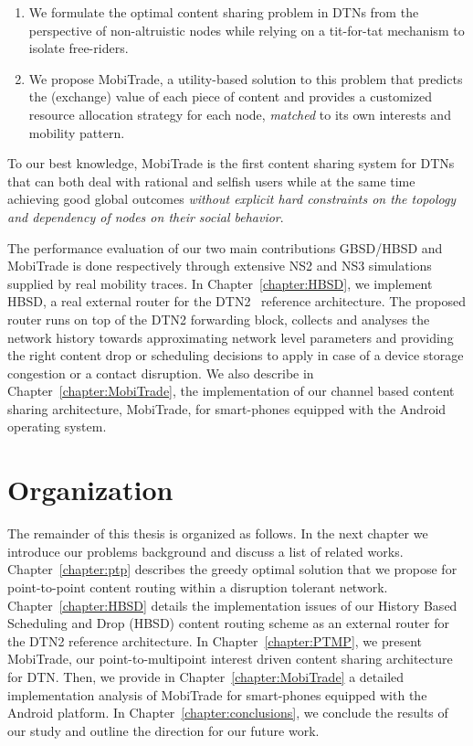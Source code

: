 \begin{enumerate}
    \item We formulate the optimal content sharing problem in DTNs from the perspective of non-altruistic nodes while relying on a tit-for-tat mechanism to isolate free-riders.
    \item We propose MobiTrade, a utility-based solution to this problem that predicts the (exchange) value of each piece of content and provides a customized resource allocation strategy for each node, \emph{matched} to its own interests and mobility pattern.
\end{enumerate}
To our best knowledge, MobiTrade is the first content sharing system for DTNs that can both deal with rational and selfish users while at the same time achieving good global outcomes \emph{without explicit hard constraints on the topology and dependency of nodes on their social behavior}. 

The performance evaluation of our two main contributions GBSD/HBSD and MobiTrade is done respectively through extensive NS2 and NS3 simulations supplied by real mobility traces. In Chapter~\ref{chapter:HBSD}, we implement HBSD, a real external router for the DTN2~\cite{HBSDDTN2} reference architecture. The proposed router runs on top of the DTN2 forwarding block, collects and analyses the network history towards approximating network level parameters and providing the right content drop or scheduling decisions to apply in case of a device storage congestion or a contact disruption. We also describe in Chapter~\ref{chapter:MobiTrade}, the implementation of our channel based content sharing architecture, MobiTrade, for smart-phones equipped with the Android operating system. 

\section{Organization}

The remainder of this thesis is organized as follows. In the next chapter we introduce our problems background and discuss a list of related works. Chapter~\ref{chapter:ptp} describes the 
greedy optimal solution that we propose for point-to-point content routing within a disruption tolerant network. Chapter~\ref{chapter:HBSD} details the implementation issues of our History Based Scheduling and Drop (HBSD) content routing scheme as an external router for the DTN2 reference architecture. In Chapter~\ref{chapter:PTMP}, we present MobiTrade, our point-to-multipoint interest driven content sharing architecture for DTN. Then, we provide in Chapter~\ref{chapter:MobiTrade} a detailed implementation analysis of MobiTrade for smart-phones equipped with the Android platform. In Chapter~\ref{chapter:conclusions}, we conclude the results of our study and outline the direction for our future work.
